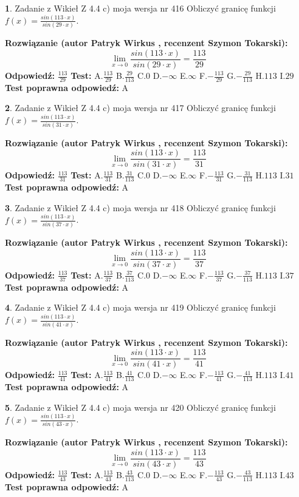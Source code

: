 \documentclass[12pt, a4paper]{article}
\theoremstyle{definition} %
\newtheorem{zad}{}
\newcommand{\zadStart}[1]{\begin{zad}#1\newline}
\newcommand{\zadStop}{\end{zad}}
\newcommand{\rozwStart}[2]{\noindent \textbf{Rozwiązanie (autor #1 , recenzent #2): }\newline}
\newcommand{\rozwStop}{\newline}
\newcommand{\odpStart}{\noindent \textbf{Odpowiedź:}\newline}
\newcommand{\odpStop}{\newline}
\newcommand{\testStart}{\noindent \textbf{Test:}\newline}
\newcommand{\testStop}{\newline}
\newcommand{\kluczStart}{\noindent \textbf{Test poprawna odpowiedź:}\newline}
\newcommand{\kluczStop}{\newline}
\begin{document}
\zadStart{Zadanie z Wikieł Z 4.4 c) moja wersja nr 416}
Obliczyć granicę funkcji $f(x)=\frac{sin(113\cdot x)}{sin(29\cdot x)}$.
\zadStop
\rozwStart{Patryk Wirkus}{Szymon Tokarski}
$$\lim\limits_{x\to 0}\frac{sin(113\cdot x)}{sin(29\cdot x)}=
\frac{113}{29}$$
\rozwStop
\odpStart
$\frac{113}{29}$
\odpStop
\testStart
A.$\frac{113}{29}$
B.$\frac{29}{113}$
C.$0$
D.$-\infty$
E.$\infty$
F.$-\frac{113}{29}$
G.$-\frac{29}{113}$
H.$113$
I.$29$
\testStop
\kluczStart
A
\kluczStop



\zadStart{Zadanie z Wikieł Z 4.4 c) moja wersja nr 417}
Obliczyć granicę funkcji $f(x)=\frac{sin(113\cdot x)}{sin(31\cdot x)}$.
\zadStop
\rozwStart{Patryk Wirkus}{Szymon Tokarski}
$$\lim\limits_{x\to 0}\frac{sin(113\cdot x)}{sin(31\cdot x)}=
\frac{113}{31}$$
\rozwStop
\odpStart
$\frac{113}{31}$
\odpStop
\testStart
A.$\frac{113}{31}$
B.$\frac{31}{113}$
C.$0$
D.$-\infty$
E.$\infty$
F.$-\frac{113}{31}$
G.$-\frac{31}{113}$
H.$113$
I.$31$
\testStop
\kluczStart
A
\kluczStop



\zadStart{Zadanie z Wikieł Z 4.4 c) moja wersja nr 418}
Obliczyć granicę funkcji $f(x)=\frac{sin(113\cdot x)}{sin(37\cdot x)}$.
\zadStop
\rozwStart{Patryk Wirkus}{Szymon Tokarski}
$$\lim\limits_{x\to 0}\frac{sin(113\cdot x)}{sin(37\cdot x)}=
\frac{113}{37}$$
\rozwStop
\odpStart
$\frac{113}{37}$
\odpStop
\testStart
A.$\frac{113}{37}$
B.$\frac{37}{113}$
C.$0$
D.$-\infty$
E.$\infty$
F.$-\frac{113}{37}$
G.$-\frac{37}{113}$
H.$113$
I.$37$
\testStop
\kluczStart
A
\kluczStop



\zadStart{Zadanie z Wikieł Z 4.4 c) moja wersja nr 419}
Obliczyć granicę funkcji $f(x)=\frac{sin(113\cdot x)}{sin(41\cdot x)}$.
\zadStop
\rozwStart{Patryk Wirkus}{Szymon Tokarski}
$$\lim\limits_{x\to 0}\frac{sin(113\cdot x)}{sin(41\cdot x)}=
\frac{113}{41}$$
\rozwStop
\odpStart
$\frac{113}{41}$
\odpStop
\testStart
A.$\frac{113}{41}$
B.$\frac{41}{113}$
C.$0$
D.$-\infty$
E.$\infty$
F.$-\frac{113}{41}$
G.$-\frac{41}{113}$
H.$113$
I.$41$
\testStop
\kluczStart
A
\kluczStop



\zadStart{Zadanie z Wikieł Z 4.4 c) moja wersja nr 420}
Obliczyć granicę funkcji $f(x)=\frac{sin(113\cdot x)}{sin(43\cdot x)}$.
\zadStop
\rozwStart{Patryk Wirkus}{Szymon Tokarski}
$$\lim\limits_{x\to 0}\frac{sin(113\cdot x)}{sin(43\cdot x)}=
\frac{113}{43}$$
\rozwStop
\odpStart
$\frac{113}{43}$
\odpStop
\testStart
A.$\frac{113}{43}$
B.$\frac{43}{113}$
C.$0$
D.$-\infty$
E.$\infty$
F.$-\frac{113}{43}$
G.$-\frac{43}{113}$
H.$113$
I.$43$
\testStop
\kluczStart
A
\kluczStop
\end{document}
